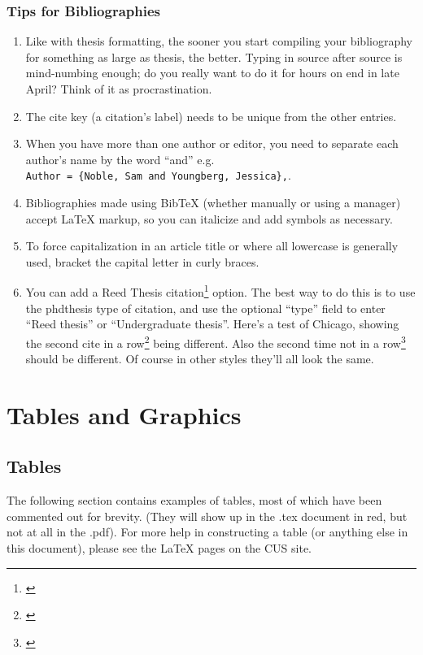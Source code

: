 \subsection{Tips for Bibliographies}
\begin{enumerate}
\item Like with thesis formatting, the sooner you start compiling your bibliography for something as large as thesis, the better. Typing in source after source is mind-numbing enough; do you really want to do it for hours on end in late April? Think of it as procrastination.
\item The cite key (a citation's label) needs to be unique from the other entries.
\item When you have more than one author or editor, you need to separate each author's name by the word ``and'' e.g.\\ \verb+Author = {Noble, Sam and Youngberg, Jessica},+.
\item Bibliographies made using BibTeX (whether manually or using a manager) accept LaTeX markup, so you can italicize and add symbols as necessary.
\item To force capitalization in an article title or where all lowercase is generally used, bracket the capital letter in curly braces.
\item You can add a Reed Thesis citation\footnote{\cite{noble:2002}} option. The best way to do this is to use the phdthesis type of citation, and use the optional ``type'' field to enter ``Reed thesis'' or ``Undergraduate thesis''. Here's a test of Chicago, showing the second cite in a row\footnote{\cite{noble:2002}} being different. Also the second time not in a row\footnote{\cite{reedweb:2007}} should be different. Of course in other styles they'll all look the same.
\end{enumerate}

\chapter{Tables and Graphics}

\section{Tables}
	The following section contains examples of tables, most of which have been commented out for brevity. (They will show up in the .tex document in red, but not at all in the .pdf). For more help in constructing a table (or anything else in this document), please see the LaTeX pages on the CUS site. 

